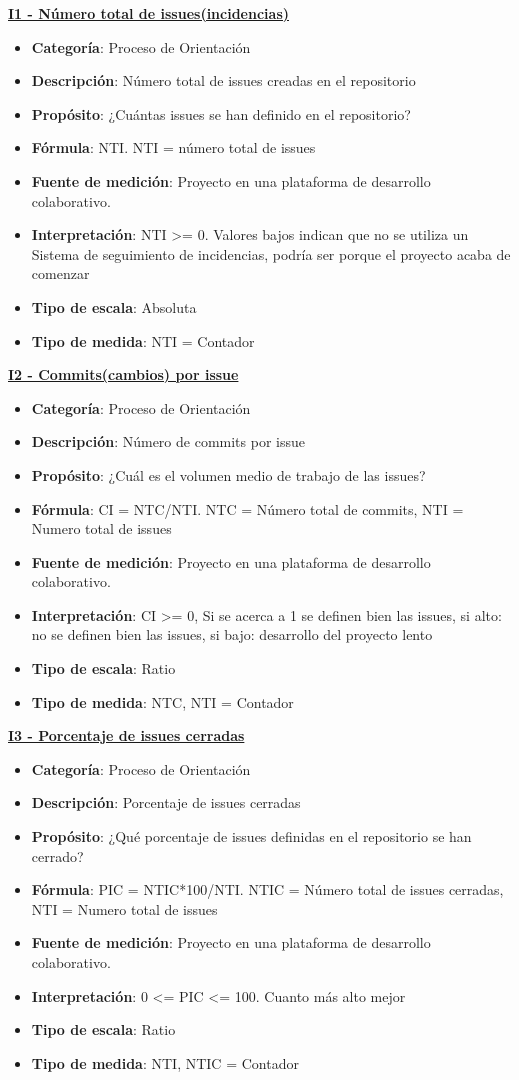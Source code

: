 \textbf{\underline{I1 - Número total de issues(incidencias)}}
\begin{itemize}
	\tightlist
	\item \textbf{Categoría}: Proceso de Orientación
	\item \textbf{Descripción}: Número total de issues creadas en el repositorio
	\item \textbf{Propósito}: ¿Cuántas issues se han definido en el repositorio?
	\item \textbf{Fórmula}: NTI. NTI = número total de issues
	\item \textbf{Fuente de medición}: Proyecto en una plataforma de desarrollo colaborativo.
	\item \textbf{Interpretación}: NTI >= 0. Valores bajos indican que no se utiliza un Sistema de seguimiento de incidencias, podría ser porque el proyecto acaba de comenzar
	\item \textbf{Tipo de escala}: Absoluta
	\item \textbf{Tipo de medida}: NTI = Contador
\end{itemize}
\textbf{\underline{I2 - Commits(cambios) por issue}}
\begin{itemize}
	\tightlist
	\item \textbf{Categoría}: Proceso de Orientación
	\item \textbf{Descripción}: Número de commits por issue
	\item \textbf{Propósito}: ¿Cuál es el volumen medio de trabajo de las issues?
	\item \textbf{Fórmula}: CI = NTC/NTI. NTC = Número total de commits, NTI = Numero total de issues
	\item \textbf{Fuente de medición}: Proyecto en una plataforma de desarrollo colaborativo.
	\item \textbf{Interpretación}: CI >= 0, Si se acerca a 1 se definen bien las issues, si alto: no se definen bien las issues, si bajo: desarrollo del proyecto lento
	\item \textbf{Tipo de escala}: Ratio 
	\item \textbf{Tipo de medida}: NTC, NTI = Contador
\end{itemize}
\textbf{\underline{I3 - Porcentaje de issues cerradas}}
\begin{itemize}
	\tightlist
	\item \textbf{Categoría}: Proceso de Orientación
	\item \textbf{Descripción}: Porcentaje de issues cerradas
	\item \textbf{Propósito}: ¿Qué porcentaje de issues definidas en el repositorio se han cerrado?
	\item \textbf{Fórmula}: PIC = NTIC*100/NTI. NTIC = Número total de issues cerradas, NTI = Numero total de issues
	\item \textbf{Fuente de medición}: Proyecto en una plataforma de desarrollo colaborativo.
	\item \textbf{Interpretación}: 0 <= PIC <= 100. Cuanto más alto mejor
	\item \textbf{Tipo de escala}: Ratio
	\item \textbf{Tipo de medida}: NTI, NTIC = Contador
\end{itemize}
